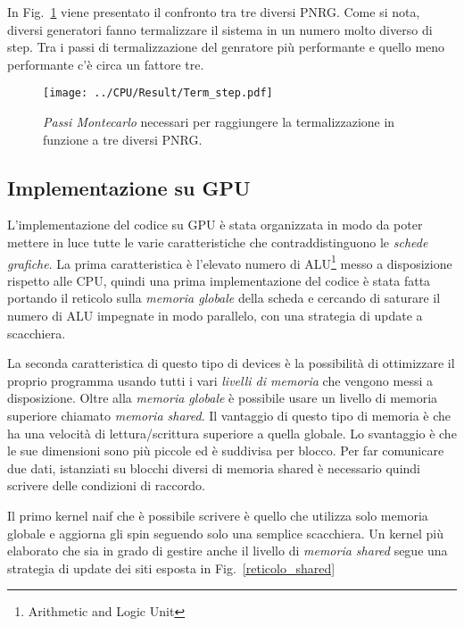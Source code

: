 \documentclass[a4paper,12pt]{article}
\begin{document}
In Fig.~\ref{figura:randomCPU} viene presentato il confronto tra tre diversi PNRG. Come si nota, diversi generatori fanno termalizzare il sistema in un numero molto diverso di step. Tra i passi di termalizzazione del genratore pi\`u performante e quello meno performante c'\`e circa un fattore tre. 
\begin{figure}
\centering
	\texttt{[image: ../CPU/Result/Term\_step.pdf]}
	\caption{\emph{Passi Montecarlo} necessari per raggiungere la termalizzazione in funzione a tre diversi PNRG.}
	\label{figura:randomCPU}
\end{figure}
\subsection{Implementazione su GPU}
L'implementazione del codice su GPU \`e stata organizzata in modo da poter mettere in luce tutte le varie caratteristiche che contraddistinguono le \emph{schede grafiche}. La prima caratteristica \`e l'elevato numero di ALU\footnote{Arithmetic and Logic Unit} messo a disposizione rispetto alle CPU, quindi una prima implementazione del codice \`e stata fatta portando il reticolo sulla \emph{memoria globale} della scheda e cercando di saturare il numero di ALU impegnate in modo parallelo, con una strategia di update a scacchiera.

La seconda caratteristica di questo tipo di devices \`e la possibilit\`a di ottimizzare il proprio programma usando tutti i vari \emph{livelli di memoria} che vengono messi a disposizione. Oltre alla \emph{memoria globale} \`e possibile usare un livello di memoria superiore chiamato \emph{memoria shared}. Il vantaggio di questo tipo di memoria \`e che ha una velocit\`a di lettura/scrittura superiore a quella globale. Lo svantaggio \`e che le sue dimensioni sono pi\`u piccole ed \`e suddivisa per blocco. Per far comunicare due dati, istanziati su blocchi diversi di memoria shared \`e necessario quindi scrivere delle condizioni di raccordo.

Il primo kernel naif che \`e possibile scrivere \`e quello che utilizza solo memoria globale e aggiorna gli spin seguendo solo una semplice scacchiera. Un kernel pi\`u elaborato che sia in grado di gestire anche il livello di \emph{memoria shared} segue una strategia di update dei siti esposta in Fig.~\ref{reticolo_shared} 
\end{document}

